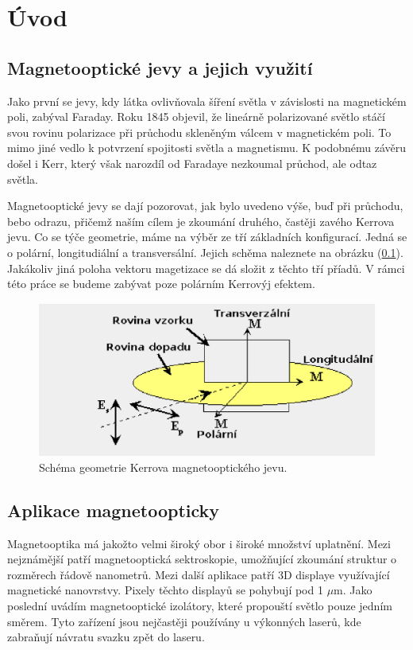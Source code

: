 \chapter*{Úvod}

\section{Magnetooptické jevy a jejich využití}
Jako první se jevy, kdy látka ovlivňovala šíření světla v závislosti na magnetickém poli, zabýval Faraday. Roku 1845 objevil, že lineárně polarizované světlo stáčí svou rovinu polarizace při průchodu skleněným válcem v magnetickém poli. To mimo jiné vedlo k potvrzení spojitosti světla a magnetismu. K podobnému závěru došel i Kerr, který však narozdíl od Faradaye nezkoumal průchod, ale odtaz světla.

Magnetooptické jevy se dají pozorovat, jak bylo uvedeno výše, buď při průchodu, bebo odrazu, přičemž naším cílem je zkoumání druhého, častěji zavého Kerrova jevu. Co se týče geometrie, máme na výběr ze tří základních konfigurací. Jedná se o polární, longitudiální a transversální. Jejich schěma naleznete na obrázku (\ref{schema geo}). Jakákoliv jiná poloha vektoru magetizace se dá složit z těchto tří příadů. V rámci této práce se budeme zabývat poze polárním Kerrovýj efektem.

\begin{figure}
    \includegraphics{img/polar.eps}
    \caption{Schéma geometrie Kerrova magnetooptického jevu.}
    \label{schema geo}
\end{figure}

\section{Aplikace magnetoopticky}
Magnetooptika má jakožto velmi široký obor i široké množství uplatnění. Mezi nejznámější patří magnetooptická sektroskopie, umožňující zkoumání struktur o rozměrech řádově nanometrů. Mezi další aplikace patří 3D displaye využívající magnetické nanovrstvy. Pixely těchto displayů se pohybují pod 1 $\mu$m. Jako poslední uvádím magnetooptické izolátory, které propouští světlo pouze jedním směrem. Tyto zařízení jsou nejčastěji používány u výkonných laserů, kde zabraňují návratu svazku zpět do laseru.
